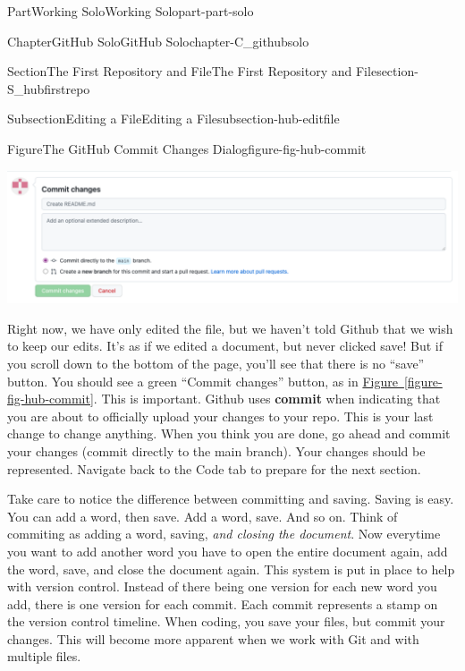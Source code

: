 \documentclass[oneside,10pt,]{book}
\newcommand{\xreffont}{\relax}
\newcommand{\terminology}[1]{\textbf{#1}}
\begin{document}
\begin{partptx}{Part}{Working Solo}{}{Working Solo}{}{}{part-part-solo}
\begin{chapterptx}{Chapter}{GitHub Solo}{}{GitHub Solo}{}{}{chapter-C_githubsolo}
\begin{sectionptx}{Section}{The First Repository and File}{}{The First Repository and File}{}{}{section-S_hubfirstrepo}
\begin{subsectionptx}{Subsection}{Editing a File}{}{Editing a File}{}{}{subsection-hub-editfile}
\begin{figureptx}{Figure}{The GitHub Commit Changes Dialog}{figure-fig-hub-commit}{}
\begin{image}{0.05}{0.9}{0.05}{}%
\includegraphics[width=\linewidth]{external/hub_commit.pdf}
\end{image}%
\tcblower
\end{figureptx}%
 Right now, we have only edited the file, but we haven't told Github that we wish to keep our edits. It's as if we edited a document, but never clicked save! But if you scroll down to the bottom of the page, you'll see that there is no ``save'' button. You should see a green ``Commit changes'' button, as in \hyperref[figure-fig-hub-commit]{Figure~{\xreffont\ref{figure-fig-hub-commit}}}. This is important. Github uses \terminology{commit} when indicating that you are about to officially upload your changes to your repo. This is your last change to change anything. When you think you are done, go ahead and commit your changes (commit directly to the main branch). Your changes should be represented. Navigate back to the Code tab to prepare for the next section.%
\par
Take care to notice the difference between committing and saving. Saving is easy. You can add a word, then save. Add a word, save. And so on. Think of commiting as adding a word, saving, \emph{and closing the document}. Now everytime you want to add another word you have to open the entire document again, add the word, save, and close the document again. This system is put in place to help with version control. Instead of there being one version for each new word you add, there is one version for each commit. Each commit represents a stamp on the version control timeline. When coding, you save your files, but commit your changes. This will become more apparent when we work with Git and with multiple files.%
\par

\end{subsectionptx}
\end{sectionptx}
\end{chapterptx}
\end{partptx}
\end{document}
